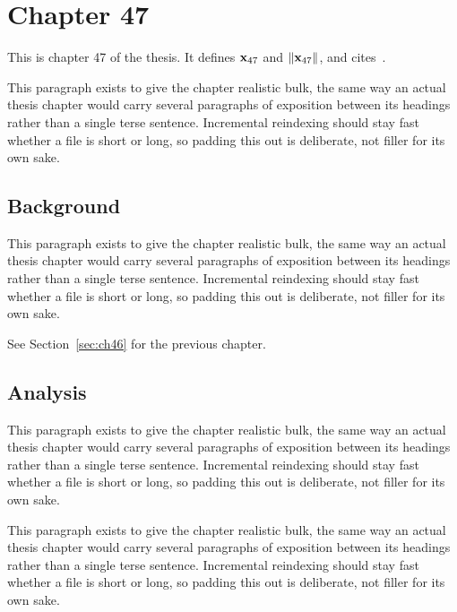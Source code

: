 \section{Chapter 47}
\label{sec:ch47}

This is chapter 47 of the thesis. It defines $\mathbf{x}_{47}$ and $\lVert \mathbf{x}_{47} \rVert$, and cites~\cite{ref1}.

This paragraph exists to give the chapter realistic bulk, the same way an actual thesis chapter would carry several paragraphs of exposition between its headings rather than a single terse sentence. Incremental reindexing should stay fast whether a file is short or long, so padding this out is deliberate, not filler for its own sake.

\subsection{Background}
\label{sec:ch47:background}

This paragraph exists to give the chapter realistic bulk, the same way an actual thesis chapter would carry several paragraphs of exposition between its headings rather than a single terse sentence. Incremental reindexing should stay fast whether a file is short or long, so padding this out is deliberate, not filler for its own sake.

See Section~\ref{sec:ch46} for the previous chapter.

\subsection{Analysis}
\label{sec:ch47:analysis}

This paragraph exists to give the chapter realistic bulk, the same way an actual thesis chapter would carry several paragraphs of exposition between its headings rather than a single terse sentence. Incremental reindexing should stay fast whether a file is short or long, so padding this out is deliberate, not filler for its own sake.

This paragraph exists to give the chapter realistic bulk, the same way an actual thesis chapter would carry several paragraphs of exposition between its headings rather than a single terse sentence. Incremental reindexing should stay fast whether a file is short or long, so padding this out is deliberate, not filler for its own sake.
